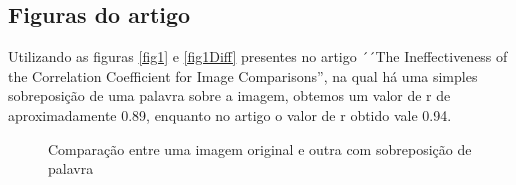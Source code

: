\documentclass[10pt,a4paper]{article}
\begin{document}
\subsection{Figuras do artigo }
Utilizando as figuras \ref{fig1} e \ref{fig1Diff} presentes no artigo ´´The Ineffectiveness of the Correlation
Coefficient for Image Comparisons'', na qual há uma simples
sobreposição de uma palavra sobre a imagem, obtemos um valor de r de
aproximadamente 0.89, enquanto no artigo o valor de r obtido vale
0.94. 
\begin{figure}[h!]
  \begin{center}
    \hspace{10mm}
    \caption{Comparação entre uma imagem original e outra com sobreposição
      de palavra}
  \end{center}
\end{figure}
\end{document}
